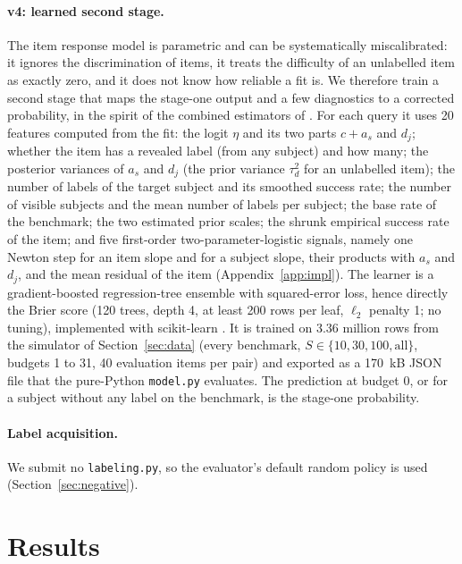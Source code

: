 \documentclass{article}
\begin{document}
\paragraph{v4: learned second stage.} The item response model is parametric and can be systematically miscalibrated: it ignores the discrimination of items, it treats the difficulty of an unlabelled item as exactly zero, and it does not know how reliable a fit is. We therefore train a second stage that maps the stage-one output and a few diagnostics to a corrected probability, in the spirit of the combined estimators of \citet{polo2024tiny}. For each query it uses 20 features computed from the fit: the logit $\eta$ and its two parts $c+a_s$ and $d_j$; whether the item has a revealed label (from any subject) and how many; the posterior variances of $a_s$ and $d_j$ (the prior variance $\tau_d^2$ for an unlabelled item); the number of labels of the target subject and its smoothed success rate; the number of visible subjects and the mean number of labels per subject; the base rate of the benchmark; the two estimated prior scales; the shrunk empirical success rate of the item; and five first-order two-parameter-logistic signals, namely one Newton step for an item slope and for a subject slope, their products with $a_s$ and $d_j$, and the mean residual of the item (Appendix~\ref{app:impl}). The learner is a gradient-boosted regression-tree ensemble \citep{friedman2001greedy} with squared-error loss, hence directly the Brier score (120 trees, depth 4, at least 200 rows per leaf, $\ell_2$ penalty 1; no tuning), implemented with scikit-learn \citep{pedregosa2011scikit}. It is trained on 3.36 million rows from the simulator of Section~\ref{sec:data} (every benchmark, $S\in\{10,30,100,\text{all}\}$, budgets 1 to 31, 40 evaluation items per pair) and exported as a 170~kB JSON file that the pure-Python \texttt{model.py} evaluates. The prediction at budget 0, or for a subject without any label on the benchmark, is the stage-one probability.

\paragraph{Label acquisition.} We submit no \texttt{labeling.py}, so the evaluator's default random policy is used (Section~\ref{sec:negative}).

\section{Results}
\label{sec:results}
\end{document}
